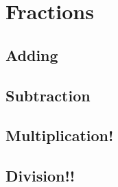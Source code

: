 \documentclass[a4paper, 12pt]{article}
\begin{document}
	
	
	{\Large \section {Fractions}}
	
	\subsection{Adding}
	\subsection{Subtraction}
	\subsection{Multiplication!}
	\subsection{Division!!}

	
		
\end{document}
